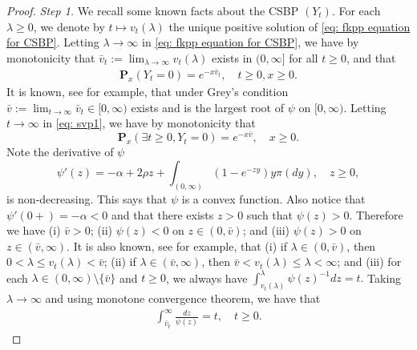 \documentclass[12pt,a4paper]{amsart}
\theoremstyle{plain}
\theoremstyle{definition}
\numberwithin{equation}{section}
\begin{document}
\begin{proof}
  \emph{Step 1.} 
  We recall some known facts about the CSBP $(Y_t)$.
  For each $\lambda \geq 0$, we denote by $t\mapsto v_t(\lambda)$ the unique positive solution of \eqref{eq: fkpp equation for CSBP}.
  Letting $\lambda \to \infty$ in \eqref{eq: fkpp equation for CSBP}, we have by monotonicity that $\bar v_t:= \lim_{\lambda \to \infty}v_t(\lambda)$ exists in $(0,\infty]$ for all $t\geq 0$, and that
  \begin{align}
    \label{eq: svp1}
    \mathbf P_x(Y_t = 0)=e^{-x\bar v_t}, \quad t\geq 0, x\ge 0.
  \end{align}
  It is known, see \cite[Theorems 3.5--3.8]{Li2011Measure-valued} for example, that under Grey's condition $\bar v:= \lim_{t\to \infty} \bar v_t \in [0,\infty)$ exists and is the largest root of $\psi$ on $[0,\infty)$.
  Letting $t \to \infty$ in \eqref{eq: svp1}, we have by monotonicity that
  \[
    \mathbf P_x(\exists t \geq 0, Y_t = 0)
    = e^{-x\bar v}, \quad x\geq 0.
  \]
  Note the derivative of $\psi$
  \[
    \psi'(z)
    = -\alpha + 2\rho z + \int_{(0,\infty)}(1-e^{-zy})y\pi(dy),\quad z\geq 0,
  \]
  is non-decreasing.
  This says that $\psi$ is a convex function.
  Also notice that $\psi'(0+)=-\alpha <0$ and that there exists $z>0$ such that $\psi(z)>0$.
  Therefore we have (i) $\bar v > 0$; (ii) $\psi(z) < 0$ on $z\in (0,\bar v)$; and (iii) $\psi(z) > 0 $ on $z\in (\bar v, \infty)$.
  It is also known, see \cite[Proposition 3.3]{Li2011Measure-valued} for example, that (i) if $\lambda \in (0,\bar v)$, then $0<\lambda \leq v_t(\lambda)<\bar v $; (ii) if $\lambda \in (\bar v, \infty)$, then $\bar v < v_t(\lambda)\leq \lambda< \infty$; and (iii) for each $\lambda \in (0,\infty)\setminus \{\bar v\}$ and $t\geq 0$, we always have
    \(
      \int_{v_t(\lambda)}^\lambda  \psi(z)^{-1}dz = t.
    \)
  Taking $\lambda \to \infty$ and using monotone convergence theorem, we have that
  \begin{align}
    \label{eq:svp2}
    \int_{\bar v_t}^\infty \frac{dz}{\psi(z)} = t, \quad t\geq 0.
  \end{align}


\end{proof}
\end{document}
